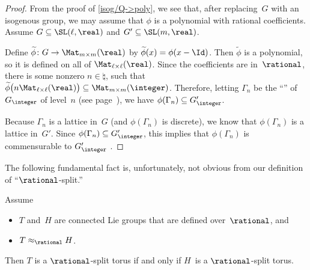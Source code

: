 \begin{proof}
From the proof of \cref{isog/Q->poly}, we see
that, after replacing~$G$ with an isogenous group, we may
assume that $\phi$ is a polynomial with rational
coefficients. Assume $G \subseteq \SL(\ell,\real)$ and $G'
\subseteq \SL(m,\real)$.

Define $\widetilde\phi \colon G \to \Mat_{m \times m}(\real)$ by
$\widetilde\phi(x) = \phi(x - \Id)$. Then $\widetilde\phi$ is a polynomial, so it is defined on all of $\Mat_{\ell \times
\ell}(\real)$. Since the coefficients are in~$\rational$, there
is some nonzero $n \in \natural$, such that $\widetilde\phi\bigl( n
\Mat_{\ell \times \ell}(\real)  \bigr) \subseteq \Mat_{m \times
m}(\integer)$. Therefore, letting $\Gamma_n$ be the ``'' of~$G_{\integer}$ of level~$n$ (see page~\pageref{PrincCongSubgrp}), we have
$\phi(\Gamma_n) \subseteq G'_{\integer}$.

Because $\Gamma_n$ is a lattice in~$G$ (and
$\phi(\Gamma_n)$ is discrete), we know that
$\phi(\Gamma_n)$ is a lattice in~$G'$. Since
$\phi(\Gamma_n) \subseteq G'_{\integer}$, this implies that
$\phi(\Gamma_n)$ is commensurable to $G'_{\integer}$
.
 \end{proof}


The following fundamental fact is, unfortunately, not obvious from our definition of ``$\rational$-split\zz.''

\begin{prop} \label{QsplitInvtIsog}
Assume 
	\begin{itemize}
	\item $T$ and~$H$ are connected Lie groups that are defined over\/~$\rational$,
	and
	\item $T \approx_\rational H$.
	\end{itemize}
Then $T$ is a\/ $\rational$-split torus if and only if $H$~is a\/ $\rational$-split torus.
\end{prop}

